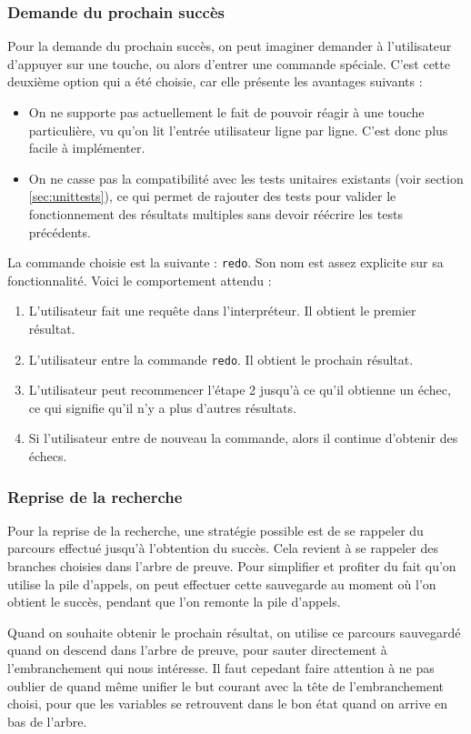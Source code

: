 \documentclass[../report.tex]{subfiles}
\begin{document}
\subsubsection{Demande du prochain succès}
Pour la demande du prochain succès, on peut imaginer demander à l'utilisateur d'appuyer sur une touche, ou alors d'entrer une commande spéciale. C'est cette deuxième option qui a été choisie, car elle présente les avantages suivants :
\begin{itemize}
    \item On ne supporte pas actuellement le fait de pouvoir réagir à une touche particulière, vu qu'on lit l'entrée utilisateur ligne par ligne. C'est donc plus facile à implémenter.
    \item On ne casse pas la compatibilité avec les tests unitaires existants (voir section \ref{sec:unittests}), ce qui permet de rajouter des tests pour valider le fonctionnement des résultats multiples sans devoir réécrire les tests précédents.
\end{itemize}
La commande choisie est la suivante : \texttt{redo}. Son nom est assez explicite sur sa fonctionnalité. Voici le comportement attendu :
\begin{enumerate}
    \item L'utilisateur fait une requête dans l'interpréteur. Il obtient le premier résultat.
    \item L'utilisateur entre la commande \texttt{redo}. Il obtient le prochain résultat.
    \item L'utilisateur peut recommencer l'étape 2 jusqu'à ce qu'il obtienne un échec, ce qui signifie qu'il n'y a plus d'autres résultats.
    \item Si l'utilisateur entre de nouveau la commande, alors il continue d'obtenir des échecs.
\end{enumerate}
\subsubsection{Reprise de la recherche}
Pour la reprise de la recherche, une stratégie possible est de se rappeler du parcours effectué jusqu'à l'obtention du succès. Cela revient à se rappeler des branches choisies dans l'arbre de preuve. Pour simplifier et profiter du fait qu'on utilise la pile d'appels, on peut effectuer cette sauvegarde au moment où l'on obtient le succès, pendant que l'on remonte la pile d'appels.

Quand on souhaite obtenir le prochain résultat, on utilise ce parcours sauvegardé quand on descend dans l'arbre de preuve, pour sauter directement à l'embranchement qui nous intéresse. Il faut cepedant faire attention à ne pas oublier de quand même unifier le but courant avec la tête de l'embranchement choisi, pour que les variables se retrouvent dans le bon état quand on arrive en bas de l'arbre.
\end{document}
